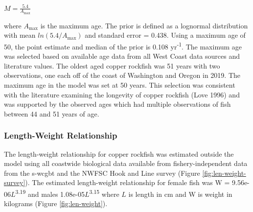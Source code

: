 \documentclass[11pt,
  english,
  a4paper,
]{article}
\begin{document}
\leavevmode\tagmcend\tagstructend\par

\begin{centering}

$M=\frac{5.4}{A_{\text{max}}}$

\end{centering}

\vspace{0.5cm}


where {\(A_{\text{max}}\)\leavevmode\tagmcend\tagstructend} is the maximum age. The prior is defined as a lognormal distribution with mean {\(ln(5.4/A_{\text{max}})\)\leavevmode\tagmcend\tagstructend} and standard error = 0.438. Using a maximum age of 50, the point estimate and median of the prior is 0.108 yr\textsuperscript{-1}. The maximum age was selected based on available age data from all West Coast data sources and literature values. The oldest aged copper rockfish was 51 years with two observations, one each off of the coast of Washington and Oregon in 2019. The maximum age in the model was set at 50 years. This selection was consistent with the literature examining the longevity of copper rockfish {(Love 1996)\leavevmode\tagmcend\tagstructend} and was supported by the observed ages which had multiple observations of fish between 44 and 51 years of age.

\leavevmode\tagmcend\tagstructend\par


\hypertarget{length-weight-relationship}{%
\subsubsection{Length-Weight Relationship}\label{length-weight-relationship}}

\leavevmode\tagmcend\tagstructend


The length-weight relationship for copper rockfish was estimated outside the model using all coastwide biological data available from fishery-independent data from the \gls{s-wcgbt} and the NWFSC Hook and Line survey (Figure \ref{fig:len-weight-survey}). The estimated length-weight relationship for female fish was W = 9.56e-06{\(L\)\leavevmode\tagmcend\tagstructend}\textsuperscript{3.19} and males 1.08e-05{\(L\)\leavevmode\tagmcend\tagstructend}\textsuperscript{3.15} where {\(L\)\leavevmode\tagmcend\tagstructend} is length in cm and W is weight in kilograms (Figure \ref{fig:len-weight}).
\end{document}
